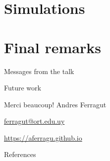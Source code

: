 \documentclass[aspectratio=169]{beamer}
\begin{document}
\section{Simulations}


\section{Final remarks}

\begin{frame}{Messages from the talk}
	
\end{frame}

\begin{frame}{Future work}
	
\end{frame}


\begin{frame}[plain]
	\vfill
	{\Huge \alert{Merci beaucoup!}}
	\vfill
	Andres Ferragut

	\smallskip

	\href{mailto://ferragut@ort.edu.uy}{\alert{ferragut@ort.edu.uy}}
	
	\smallskip

	\href{http://aferragu.github.io}{\alert{https://aferragu.github.io}}
\end{frame}

\begin{frame}[allowframebreaks]{References}
	
\end{frame}
\end{document}
